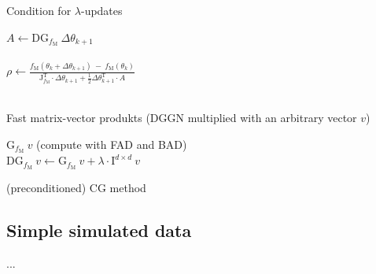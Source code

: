 \documentclass[conference]{IEEEtran}
\begin{document}
\begin{algorithm}
	\caption{Condition for $\lambda$-updates}\label{alg:three}
	$A\gets\mathrm{DG}_{f_{\mathrm{M}}}\:\Delta\theta_{k+1}$\\
		\text{}\\
	$\rho\gets \frac{f_{\mathrm{M}}(\theta_{k}+\Delta\theta_{k+1})\:-\: f_{\mathrm{M}}(\theta_{k})}{\mathrm{J}_{f_{\mathrm{M}}}^{\mathrm{T}}\cdot\Delta\theta_{k+1} + \frac{1}{2}\Delta\theta_{k+1}^{\mathrm{T}}\cdot A}$\\
	\text{}\\
	\Output{$\lambda$}
\end{algorithm}

\begin{algorithm}
	\caption{Fast matrix-vector produkts (DGGN multiplied with an arbitrary vector $v$)}\label{alg:four}
	$\mathrm{G}_{f_{\mathrm{M}}}\:v$ (compute with FAD and BAD)\\
	$\mathrm{DG}_{f_{\mathrm{M}}}\: v \gets \mathrm{G}_{f_{\mathrm{M}}}\: v + \lambda\cdot\mathrm{I}^{d\times d}\:v$\\
\end{algorithm}

\begin{algorithm}
	\caption{(preconditioned) CG method}\label{alg:five}
	
\end{algorithm}

\subsection{Simple simulated data}
...
\end{document}
